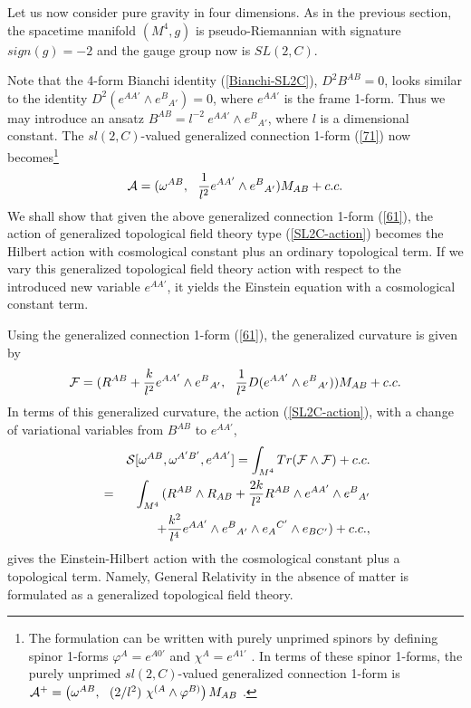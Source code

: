 \documentclass[a4paper,twocolumn,showpacs,prd]{revtex4}
\begin{document}
Let us now consider pure gravity in four
dimensions. As in the previous section, the
spacetime manifold $(M^4, g)$ is
 pseudo-Riemannian with signature $sign(g)=-2$
and the gauge group now is $SL(2, C)$.

 Note that  the
4-form Bianchi identity (\ref{Bianchi-SL2C}), $D^2 B^{AB}=0$,
looks similar to the identity $D^2(e^{AA'}\wedge e^{B}{}_{A'})=0$,
where $e^{AA'}$ is the frame 1-form. Thus we may introduce an
ansatz $B^{AB}= l^{-2}~ e^{AA'}\wedge e^B{}_{A'}$, where $l$ is a
dimensional constant. The $sl(2,C)$-valued generalized connection
1-form (\ref{71}) now becomes{\footnote{The formulation can be
written with purely unprimed spinors by defining spinor 1-forms
$\varphi^A=e^{A0'}$ and $\chi^A=e^{A1'}$ \cite{TJ}. In terms of
these spinor 1-forms, the purely unprimed $sl(2,C)$-valued
generalized connection 1-form
 is ${\cal A}^+=\left(\omega^{AB}, ~~(2 / l^2)~
\chi^{(A} \wedge \varphi^{B)} \right) M_{AB}$ .}}
\begin{equation}
{\cal A}=(\omega^{AB}, ~~{1\over l^2}
e^{AA'}\wedge e^B{}_{A'} ) M_{AB} +c.c.
\label{61}
\end{equation}
We shall show that given the above generalized connection 1-form
(\ref{61}), the action of generalized topological field theory
type (\ref{SL2C-action}) becomes the Hilbert action with
cosmological constant plus an ordinary topological term. If we
vary this generalized topological field theory action with respect
to the introduced new variable $e^{AA'}$, it yields the Einstein
equation with a cosmological constant term.

Using the generalized connection 1-form (\ref{61}), the
generalized curvature is given by
\begin{equation}
{\cal F} =(R^{AB} + {k\over l^2} e^{AA'}\wedge
 e^B{}_{A'},~~
 {1\over l^2}D (e^{AA'}\wedge e^B{}_{A'}) ) M_{AB} +c.c.
\end{equation}
In terms of this generalized curvature, the action
(\ref{SL2C-action}), with a change of variational variables from
$B^{AB}$ to $e^{AA'}$,
\begin{eqnarray}
&& {\cal
S}[\omega^{AB},\omega^{A'B'},e^{AA'}]=\int_{M^4}
Tr({\cal F}
\wedge {\cal F})+c.c. \nonumber\\
&=& \int_{M^4}\,( R^{AB} \wedge R_{AB} + {2k\over l^2}
R^{AB}\wedge e^{AA'}\wedge e^B{}_{A'} \nonumber\\
 &&+ {k^2\over l^4}
e^{AA'}\wedge e^B{}_{A'} \wedge e_{A}{}^{C'}\wedge e_{BC'} )
+c.c.,
\end{eqnarray}
 gives the Einstein-Hilbert action with the cosmological
constant plus a topological term. Namely, General Relativity in
the absence of matter is formulated as a generalized topological
field theory.
\end{document}
